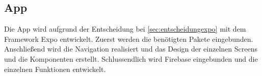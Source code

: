 \subsection{App}
Die App wird aufgrund der Entscheidung bei \ref{sec:entscheidungexpo} mit dem \Gls{Framework} Expo entwickelt. Zuerst werden die benötigten Pakete eingebunden. Anschließend wird die Navigation realisiert und das Design der einzelnen Screens und die Komponenten erstellt. Schlussendlich wird Firebase eingebunden und die einzelnen Funktionen entwickelt.

\bigskip








